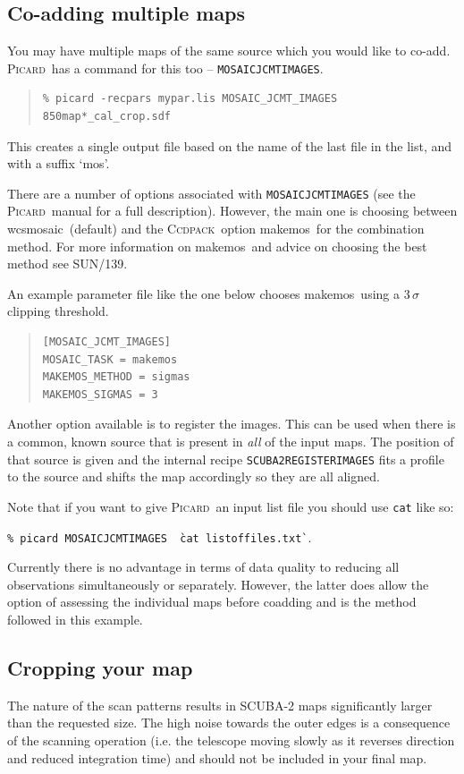 \documentclass[twoside,11pt]{article}
\newcommand{\xref}[3]{#1}
\newcommand{\xlabel}[1]{}
\renewcommand{\_}{\texttt{\symbol{95}}}
\newenvironment{myquote}{\begin{quote}\begin{small}}{\end{small}\end{quote}}
\newcommand{\ccdpack}{\xref{\textsc{Ccdpack}}{sun139}{}}
\newcommand{\picard}{\xref{\textsc{Picard}}{sun231}{}}
\newcommand{\task}[1]{\textsf{#1}}
\newcommand{\param}[1]{\texttt{#1}}
\newcommand{\wcsmosaic}{\xref{\task{wcsmosaic}}{sun95}{WCSMOSAIC}}
\newcommand{\makemos}{\xref{\task{makemos}}{sun139}{MAKEMOS}}
\begin{document}
\subsection{\xlabel{coadd}Co-adding multiple maps}
\label{sec:coadd}
You may have multiple maps of the same source which you would like to co-add. \picard\ has a command for this too -- \param{MOSAIC\_JCMT\_IMAGES}. 
\begin{myquote}
\begin{verbatim}
% picard -recpars mypar.lis MOSAIC_JCMT_IMAGES 850map*_cal_crop.sdf
\end{verbatim}
\end{myquote}
This creates a single output file based on the name of the last file in the list, and with a suffix `\_mos'.

There are a number of options associated with \param{MOSAIC\_JCMT\_IMAGES} (see the \picard\ manual for a full description). However, the main one is choosing between \wcsmosaic\ (default) and the \ccdpack\ option \makemos\ for the combination method. For more information on \makemos\ and advice on choosing the best method see SUN/139.

An example parameter file like the one below chooses \makemos\ using a 3\,$\sigma$ clipping threshold.
\begin{myquote}
\begin{verbatim}
[MOSAIC_JCMT_IMAGES]
MOSAIC_TASK = makemos
MAKEMOS_METHOD = sigmas
MAKEMOS_SIGMAS = 3
\end{verbatim}
\end{myquote}
Another option available is to register the images. This can be used when there is a common, known source that is present in \emph{all} of the input maps. The position of that source is given and the internal recipe \param{SCUBA2\_REGISTER\_IMAGES} fits a profile to the source and shifts the map accordingly so they are all aligned. 

Note that if you want to give \picard\ an input list file you should use \texttt{cat} like so:

\texttt{\% picard MOSAIC\_JCMT\_IMAGES \`\,cat listoffiles.txt\`}.

Currently there is no advantage in terms of data quality to reducing all observations simultaneously or separately. However, the latter does allow the option of assessing the individual maps before coadding and is the method followed in this example.
\subsection{\xlabel{crop}Cropping your map}
\label{sec:crop}
The nature of the scan patterns results in SCUBA-2 maps significantly larger than the requested size. The high noise  towards the outer edges is a consequence of the scanning operation (i.e. the telescope moving slowly as it reverses direction and reduced integration time) and should not be included in your final map.
\end{document}
